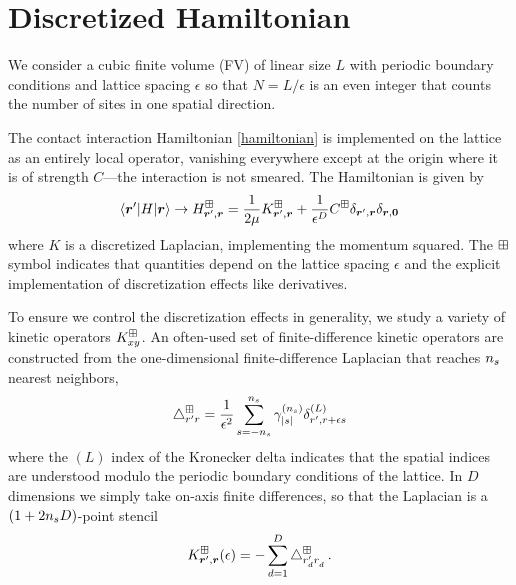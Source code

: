 \section{Discretized Hamiltonian}\label{sec:hamiltonian}

We consider a cubic finite volume (FV) of linear size $L$ with periodic boundary conditions and lattice spacing $\epsilon$ so that $N=L/\epsilon$ is an even integer that counts the number of sites in one spatial direction.

The contact interaction Hamiltonian \eqref{hamiltonian} is implemented on the lattice as an entirely local operator, vanishing everywhere except at the origin where it is of strength $C$---the interaction is not smeared.
The Hamiltonian is given by
\begin{equation}
    \left\langle \boldsymbol{r}' \middle| H \middle| \boldsymbol{r} \right\rangle
    \rightarrow
    H_{\boldsymbol{r}',\boldsymbol{r}}^\boxplus
    =
    \frac{1}{2\mu} K_{\boldsymbol{r}',\boldsymbol{r}}^\boxplus + \frac{1}{\epsilon^D} C^\boxplus \delta_{\boldsymbol{r}',\boldsymbol{r}} \delta_{\boldsymbol{r},\boldsymbol{0}}
\end{equation}
where $K$ is a discretized Laplacian, implementing the momentum squared.
The $\boxplus$ symbol indicates that quantities depend on the lattice spacing $\epsilon$ and the explicit implementation of discretization effects like derivatives.

To ensure we control the discretization effects in generality, we study a variety of kinetic operators $K_{xy}^\boxplus$.
An often-used set of finite-difference kinetic operators are constructed from the one-dimensional finite-difference Laplacian that reaches ${n_s}$ nearest neighbors,
\begin{equation}
    \mathop{}\!\mathbin\bigtriangleup^\boxplus_{r'r} = \frac{1}{\epsilon^2}\sum_{s=-{n_s}}^{{n_s}} \gamma_{\left| s \right|}^{({n_s})} \delta_{r',r+\epsilon s}^{(L)}
\end{equation}
where the $(L)$ index of the Kronecker delta indicates that the spatial indices are understood modulo the periodic boundary conditions of the lattice.
In $D$ dimensions we simply take on-axis finite differences, so that the Laplacian is a $(1+2{n_s} D)$-point stencil
\begin{equation}\label{eq:kinetic}
    K_{\boldsymbol{r}',\boldsymbol{r}}^\boxplus(\epsilon)
    =
    - \sum_{d=1}^D \mathop{}\!\mathbin\bigtriangleup_{r_d'r_d^{}}^\boxplus
    \, .
\end{equation}

